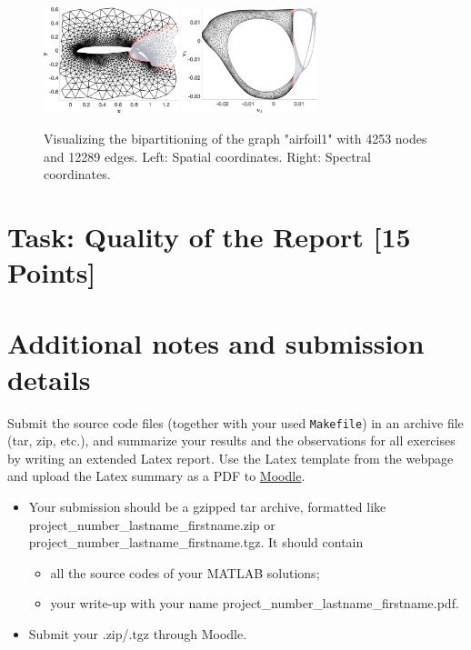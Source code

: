 \documentclass[unicode,11pt,a4paper,oneside,numbers=endperiod,openany]{scrartcl}
\begin{document}
\begin{figure}[!h]
\begin{center}
  \includegraphics[width=0.35\textwidth]{images/airfoil_part_spat.png}
  \includegraphics[width=0.35\textwidth]{images/airfoil_part_spec.png}
  \caption{Visualizing the bipartitioning of the graph "airfoil1" with 4253 nodes and 12289 edges. Left: Spatial coordinates. Right: Spectral coordinates.}
  \label{fig:spectral_layout}
\end{center}
\end{figure}



\section{Task: Quality of the Report [15 Points] }


\section*{Additional notes and submission details}
Submit the source code files (together with your used \texttt{Makefile}) in
an archive file (tar, zip, etc.), and summarize your results and the
observations for all exercises by writing an extended Latex report.
Use the Latex template from the webpage and upload the Latex summary
as a PDF to \href{https://moodle-app2.let.ethz.ch/course/view.php?id=14316}{Moodle}.

\begin{itemize}
	\item Your submission should be a gzipped tar archive, formatted like project\_number\_lastname\_firstname.zip or project\_number\_lastname\_firstname.tgz. 
	It should contain
	\begin{itemize}
		\item all the source codes of your MATLAB solutions;
		\item your write-up with your name  project\_number\_lastname\_firstname.pdf.
	\end{itemize}
	\item Submit your .zip/.tgz through Moodle.
\end{itemize}
\end{document}

